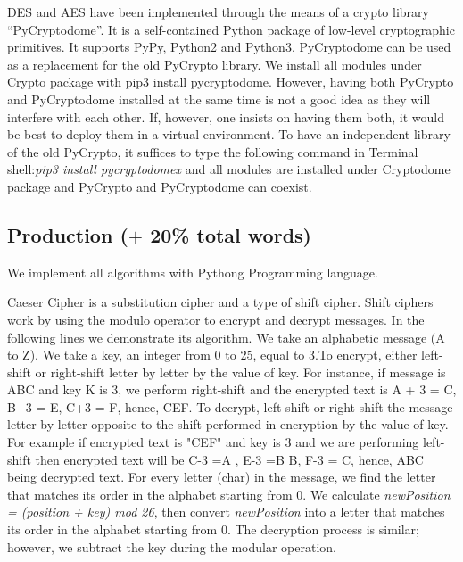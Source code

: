 DES and AES have been implemented through the means of a crypto library “PyCryptodome”. It is a self-contained Python package of low-level cryptographic primitives. It supports PyPy, Python2 and Python3. PyCryptodome can be used as a replacement for the old PyCrypto library. We install all modules under Crypto package with pip3 install pycryptodome.  However, having both PyCrypto and PyCryptodome installed at the same time is not a good idea as they will interfere with each other. If, however, one insists on having them both, it would be best to deploy them in a virtual environment. To have an independent library of the old PyCrypto, it suffices to type the following command in Terminal shell:\textit{pip3 install pycryptodomex} and all modules are installed under Cryptodome package and PyCrypto and PyCryptodome can coexist. 


\subsection{Production ($\pm$ 20\% total words)}

We implement all algorithms with Pythong Programming language. 

Caeser Cipher is a substitution cipher and a type of shift cipher. Shift ciphers work by using the modulo operator to encrypt and decrypt messages. In the following lines we demonstrate its algorithm. We take an alphabetic message (A to Z). We take a key, an integer from 0 to 25, equal to 3.To encrypt, either left-shift or right-shift letter by letter by the value of key. For instance, if message is ABC and key K is 3, we perform right-shift and the encrypted text is A + 3 = C, B+3 = E, C+3 = F, hence, CEF. To decrypt, left-shift or right-shift the message letter by letter opposite to the shift performed in encryption by the value of key. For example if encrypted text is "CEF" and key is 3 and we are performing left-shift then encrypted text will be C-3 =A , E-3 =B B, F-3 = C, hence, ABC being decrypted text. 
For every letter (char) in the message, we find the letter that matches its order in the alphabet starting from 0. We calculate \textit{newPosition = (position + key) mod 26}, then convert \textit{newPosition} into a letter that matches its order in the alphabet starting from 0. The decryption process is similar; however, we subtract the key during the modular operation.

